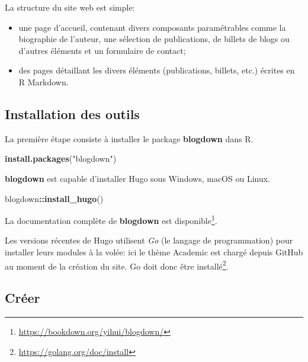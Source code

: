 \documentclass[
  12pt,
  french,
  a4paper,
  extrafontsizes,onecolumn,openright
  ]{memoir}
\newenvironment{Shaded}{\begin{snugshade}}{\end{snugshade}}
\newcommand{\KeywordTok}[1]{\textcolor[rgb]{0.13,0.29,0.53}{\textbf{#1}}}
\newcommand{\NormalTok}[1]{#1}
\newcommand{\OperatorTok}[1]{\textcolor[rgb]{0.81,0.36,0.00}{\textbf{#1}}}
\newcommand{\StringTok}[1]{\textcolor[rgb]{0.31,0.60,0.02}{#1}}
\providecommand{\tightlist}{%
  \setlength{\itemsep}{0pt}\setlength{\parskip}{0pt}}
\begin{document}
La structure du site web est simple:

\begin{itemize}
\tightlist
\item
  une page d'accueil, contenant divers composants paramétrables comme la biographie de l'auteur, une sélection de publications, de billets de blogs ou d'autres éléments et un formulaire de contact;
\item
  des pages détaillant les divers éléments (publications, billets, etc.) écrites en R Markdown.
\end{itemize}

\hypertarget{installation-des-outils}{%
\subsection{Installation des outils}\label{installation-des-outils}}

La première étape consiste à installer le package \textbf{blogdown} dans R.

\scriptsize

\begin{Shaded}
\begin{Highlighting}[]
\KeywordTok{install.packages}\NormalTok{(}\StringTok{"blogdown"}\NormalTok{)}
\end{Highlighting}
\end{Shaded}

\normalsize

\textbf{blogdown} est capable d'installer Hugo sous Windows, macOS ou Linux.

\scriptsize

\begin{Shaded}
\begin{Highlighting}[]
\NormalTok{blogdown}\OperatorTok{::}\KeywordTok{install_hugo}\NormalTok{()}
\end{Highlighting}
\end{Shaded}

\normalsize

La documentation complète de \textbf{blogdown} est disponible\footnote{\url{https://bookdown.org/yihui/blogdown/}}.

Les versions récentes de Hugo utilisent \emph{Go} (le langage de programmation) pour installer leurs modules à la volée: ici le thème Academic est chargé depuis GitHub au moment de la création du site.
Go doit donc être installé\footnote{\url{https://golang.org/doc/install}}.

\hypertarget{cruxe9er-2}{%
\subsection{Créer}\label{cruxe9er-2}}
\end{document}
